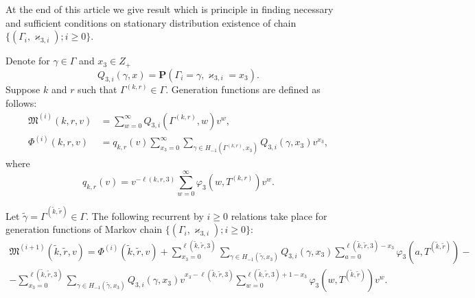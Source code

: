 \documentclass[10pt]{article}
\renewcommand{\Pr}{{\mathbf P}}
\begin{document}
At the end of this article we give result which is principle in finding necessary and sufficient conditions on stationary distribution existence of chain $\{(\Gamma_i, \varkappa_{3, i}); i \geqslant 0\}$.

Denote for $\gamma \in \Gamma$ and $x_3 \in Z_+$
\begin{equation}
Q_{3,i}(\gamma,x) = \Pr(\Gamma_{i}=\gamma, \varkappa_{3,i}=x_3).
\end{equation}
Suppose $k$ and $r$ such that $\Gamma^{(k,r)}\in \Gamma$. Generation functions are defined as follows:
\begin{align*}
\mathfrak{M}^{(i)}(k,r,v) &= \sum_{w=0}^{\infty} Q_{3,i}(\Gamma^{(k,r)},w) v^w,\\
\Phi^{(i)}(k,r,v) &= q_{k,r}(v) \sum_{x_3=0}^{\infty} \sum_{\gamma \in H_{-1}(\Gamma^{(k,r)},x_3)} Q_{3,i}(\gamma,x_3) v^{x_3},
\end{align*}
where
\begin{equation*}
q_{k,r}(v) = v^{-\ell(k,r,3)}\sum_{w=0}^{\infty} \varphi_3(w,T^{(k,r)})v^w.
\end{equation*}

\begin{thm}
Let $\tilde{\gamma}=\Gamma^{(\tilde{k},\tilde{r})} \in \Gamma$. The following recurrent by $i \geqslant 0$ relations take place for generation functions of Markov chain $\{(\Gamma_i, \varkappa_{3, i}); i \geqslant 0\}$:
\begin{multline}
\mathfrak{M}^{(i+1)}(\tilde{k},\tilde{r},v) = \Phi^{(i)}(\tilde{k},\tilde{r},v)+\sum_{x_3=0}^{\ell(\tilde{k},\tilde{r},3)}\sum_{\gamma \in H_{-1}(\tilde{\gamma},x_3)} Q_{3,i}(\gamma,x_3) \sum_{a=0}^{\ell(\tilde{k},\tilde{r},3) - x_3} \varphi_3(a,T^{(\tilde{k},\tilde{r})}) - \\
- \sum_{x_3=0}^{\ell(\tilde{k},\tilde{r},3)}  \sum_{\gamma \in H_{-1}(\tilde{\gamma},x_3)} Q_{3,i}(\gamma,x_3) v^{x_3-\ell(\tilde{k},\tilde{r},3)}  \sum_{w=0}^{\ell(\tilde{k},\tilde{r},3) + 1 -x_3}\varphi_3(w,T^{(\tilde{k},\tilde{r})}) v^w.
\label{markk_proiz}
\end{multline}
\end{thm}
\end{document}

